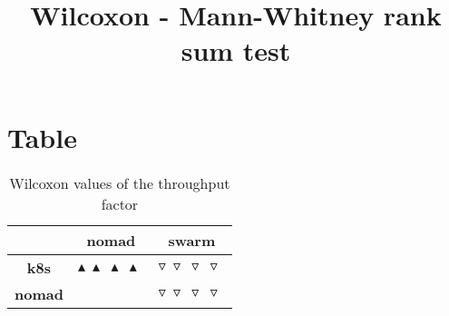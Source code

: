 \documentclass{article}
\title{Wilcoxon - Mann-Whitney rank sum test}
\author{}
\begin{document}
\maketitle
\section{Table}
\begin{table}[!htp]
  \caption{Wilcoxon values of the throughput factor}
  \label{table:throughput}
  \centering
  \begin{scriptsize}
  \begin{tabular}{c|cc}
      & \textbf{nomad} & \textbf{swarm} \\\hline
      \textbf{k8s} & $\blacktriangle\ \blacktriangle\ \blacktriangle\ \blacktriangle\  $ & $ \triangledown\ \triangledown\ \triangledown\ \triangledown\ $ \\
      \textbf{nomad} & $ $ & $ \triangledown\ \triangledown\ \triangledown\ \triangledown\ $ \\
  \end{tabular}
  \end{scriptsize}
\end{table}
\end{document}
